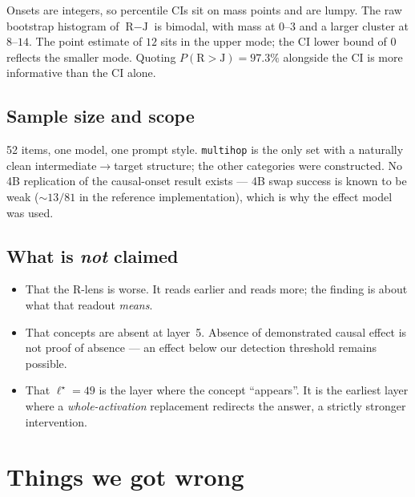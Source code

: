 \documentclass[11pt,a4paper]{article}
\newcommand{\rlens}{R\nobreakdash-lens}
\begin{document}
Onsets are integers, so percentile CIs sit on mass points and are lumpy. The raw
bootstrap histogram of $\text{R}-\text{J}$ is bimodal, with mass at $0$--$3$ and a
larger cluster at $8$--$14$. The point estimate of $12$ sits in the upper mode; the CI
lower bound of $0$ reflects the smaller mode. Quoting $P(\text{R}{>}\text{J}) = 97.3\%$
alongside the CI is more informative than the CI alone.

\subsection{Sample size and scope}

52 items, one model, one prompt style. \texttt{multihop} is the only set with a
naturally clean intermediate$\to$target structure; the other categories were
constructed. No 4B replication of the causal-onset result exists --- 4B swap success is
known to be weak ($\sim13/81$ in the reference implementation), which is why the effect
model was used.

\subsection{What is \emph{not} claimed}

\begin{itemize}[leftmargin=1.4em]
  \item That the \rlens{} is worse. It reads earlier and reads more; the finding is
        about what that readout \emph{means}.
  \item That concepts are absent at layer~5. Absence of demonstrated causal effect is
        not proof of absence --- an effect below our detection threshold remains
        possible.
  \item That $\ell^\star = 49$ is the layer where the concept ``appears''. It is the
        earliest layer where a \emph{whole-activation} replacement redirects the
        answer, a strictly stronger intervention.
\end{itemize}

\section{Things we got wrong}
\end{document}
